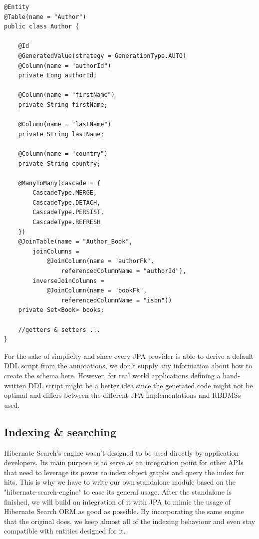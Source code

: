\lstset{language=java}
\begin{lstlisting}[frame=htrbl, caption={Author.java}, label={lst:author.java_1}]
@Entity
@Table(name = "Author")
public class Author {
	
	@Id
	@GeneratedValue(strategy = GenerationType.AUTO)
	@Column(name = "authorId")
	private Long authorId;
	
	@Column(name = "firstName")
	private String firstName;
	
	@Column(name = "lastName")
	private String lastName;
	
	@Column(name = "country")
	private String country;
	
	@ManyToMany(cascade = {
		CascadeType.MERGE, 
		CascadeType.DETACH, 
		CascadeType.PERSIST, 
		CascadeType.REFRESH
	})
	@JoinTable(name = "Author_Book", 
		joinColumns = 
			@JoinColumn(name = "authorFk", 
				referencedColumnName = "authorId"),
		inverseJoinColumns = 
			@JoinColumn(name = "bookFk", 
				referencedColumnName = "isbn"))
	private Set<Book> books;
	
	//getters & setters ...
}
\end{lstlisting}
For the sake of simplicity and since every JPA provider is able to derive a default DDL script from the annotations, we don't supply any information about how to create the schema here. However, for real world applications defining a hand-written DDL script might be a better idea since the generated code might not be optimal and differs between the different JPA implementations and RBDMSs used.

\subsection{Indexing \& searching} \label{problem_indexing_searching}
Hibernate Search's engine wasn't designed to be used directly by application developers. Its main purpose is to serve as an integration point for other APIs that need to leverage its power to index object graphs and query the index for hits. This is why we have to write our own standalone module based on the "hibernate-search-engine" to ease its general usage. After the standalone is finished, we will build an integration of it with JPA to mimic the usage of Hibernate Search ORM as good as possible. By incorporating the same engine that the original does, we keep almost all of the indexing behaviour and even stay compatible with entities designed for it.

